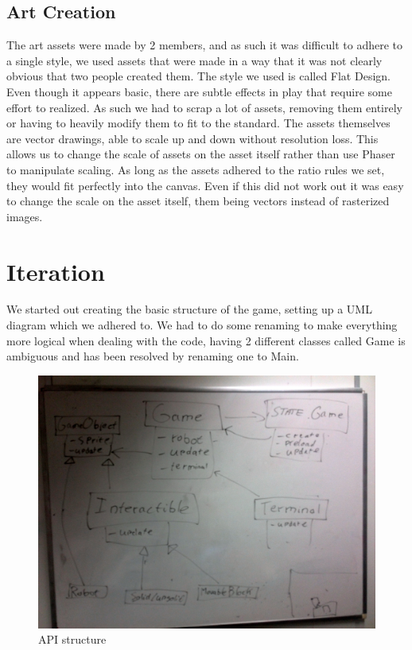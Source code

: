 \documentclass[a4paper,twoside,12pt]{article}
\begin{document}
\subsection{Art Creation}
The art assets were made by 2 members, and as such it was difficult to adhere to a single style, we used assets that were made in a way that it was not clearly obvious that two people created them. The style we used is called Flat Design. Even though it appears basic, there are subtle effects in play that require some effort to realized. As such we had to scrap a lot of assets, removing them entirely or having to heavily modify them to fit to the standard. The assets themselves are vector drawings, able to scale up and down without resolution loss. This allows us to
change the scale of assets on the asset itself rather than use Phaser to manipulate scaling. As long as the assets adhered to the ratio rules we set, they would fit perfectly into the canvas. Even if this did not work out it was easy to change the scale on the asset itself, them being vectors instead of rasterized images.

\section{Iteration}
We started out creating the basic structure of the game, setting up a UML diagram which we adhered to. We had to do some renaming to make everything more logical when dealing with the code, having 2 different classes called Game is ambiguous and has been resolved by renaming one to Main. %
\\
\begin{figure}[h]
  \includegraphics[width=1\textwidth]{API}
  \caption{API structure} 
\end{figure}
\\
\end{document}
